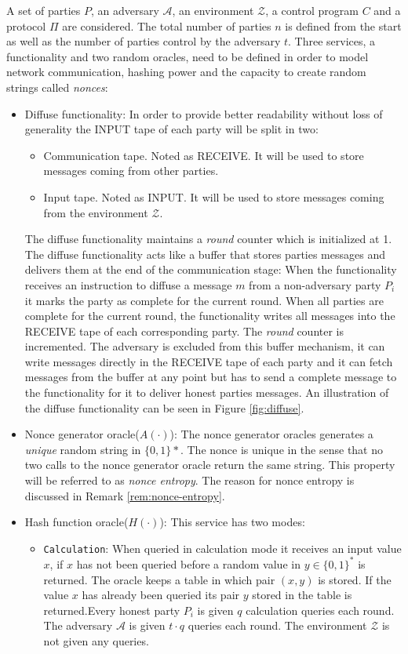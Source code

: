 \documentclass[..]{subfiles}
\begin{document}
A set of parties $P$, an adversary $\mathcal{A}$, an environment $\mathcal{Z}$, a control program $C$ and a protocol $\Pi$ are considered. The total number of parties $n$ is defined from the start as well as the number of parties control by the adversary $t$. Three services, a functionality and two random oracles, need to be defined in order to model network communication, hashing power and the capacity to create random strings called \textit{nonces}:
\begin{itemize}
	\item Diffuse functionality: In order to provide better readability without loss of generality the INPUT tape of each party will be split in two: 
	\begin{itemize}
		\item Communication tape. Noted as RECEIVE. It will be used to store messages coming from other parties.
		\item Input tape. Noted as INPUT. It will be used to store messages coming from the environment $\mathcal{Z}$.
	\end{itemize}
	The diffuse functionality maintains a \textit{round} counter which is initialized at 1. The diffuse functionality acts like a buffer that stores parties messages and delivers them at the end of the communication stage: When the functionality receives an instruction to diffuse a message $m$ from a non-adversary party $P_i$ it marks the party as complete for the current round. When all parties are complete for the current round, the functionality writes all messages into the RECEIVE tape of each corresponding party. The \textit{round} counter is incremented. The adversary is excluded from this buffer mechanism, it can write messages directly in the RECEIVE tape of each party and it can fetch messages from the buffer at any point but has to send a complete message to the functionality for it to deliver honest parties messages. An illustration of the diffuse functionality can be seen in Figure \ref{fig:diffuse}.

	\item Nonce generator oracle($A(\cdot)$): The nonce generator oracles generates a \textit{unique} random string in $\{0, 1\}*$. The nonce is unique in the sense that no two calls to the nonce generator oracle return the same string. This property will be referred to as \textit{nonce entropy}. The reason for nonce entropy is discussed in Remark \ref{rem:nonce-entropy}.

	\item Hash function oracle($H(\cdot)$): This service has two modes:
	\begin{itemize}
		\item \texttt{Calculation}: When queried in calculation mode it receives an input value $x$, if $x$ has not been queried before a random value in $y \in \{0, 1\}^*$ is returned. The oracle keeps a table in which pair $(x, y)$ is stored. If the value $x$ has already been queried its pair $y$ stored in the table is returned.Every honest party $P_i$ is given $q$ calculation queries each round. The adversary $\mathcal{A}$ is given $t \cdot q$ queries each round. The environment $\mathcal{Z}$ is not given any queries.


\end{itemize}
\end{itemize}
\end{document}
